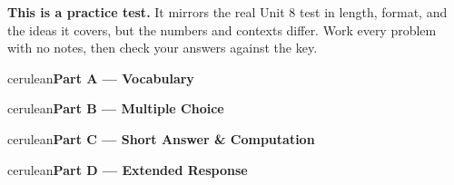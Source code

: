 \documentclass[10pt]{article}
\newcommand{\parthead}[1]{%
  \vspace{6pt}\noindent
  \begin{headlinebox}{cerulean}{\color{white}\bfseries #1}\end{headlinebox}%
  \vspace{4pt}}
\begin{document}
\namedateperiod

\vspace{0.10in}
\begin{remindbox}
\small
\textbf{This is a practice test.} It mirrors the real Unit 8 test in length, format,
and the ideas it covers, but the numbers and contexts differ. Work every problem
with no notes, then check your answers against the key.
\end{remindbox}

\parthead{Part A --- Vocabulary}

\parthead{Part B --- Multiple Choice}

\parthead{Part C --- Short Answer \& Computation}

\parthead{Part D --- Extended Response}
\end{document}

